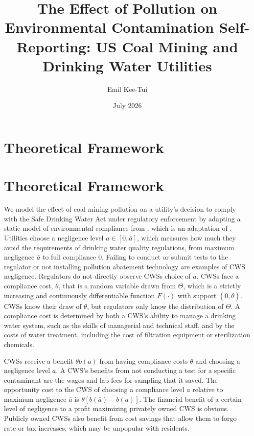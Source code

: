 \documentclass{article}
\begin{document}
\title{The Effect of Pollution on Environmental Contamination Self-Reporting: US Coal Mining and Drinking Water Utilities}
\author{Emil Kee-Tui}
    
\date{July 2026}
\maketitle
\thispagestyle{empty}
\doublespacing
	
\newpage
\doublespacing



\section{Theoretical Framework}

\section{Theoretical Framework}

We model the effect of coal mining pollution on a utility's decision to comply with the Safe Drinking Water Act under regulatory enforcement by adapting a static model of environmental compliance from \cite{kang2021understanding}, which is an adaptation of \cite{mookherjee1994marginal}. Utilities choose a negligence level $a \in [0,\bar{a}]$, which measures how much they avoid the requirements of drinking water quality regulations, from maximum negligence $\bar{a}$ to full compliance 0. Failing to conduct or submit tests to the regulator or not installing pollution abatement technology are examples of CWS negligence. Regulators do not directly observe CWSs choice of $a$. CWSs face a compliance cost, $\theta$, that is a random variable drawn from $\Theta$, which is a strictly increasing and continuously differentiable function $F(\cdot)$ with support $(0,\bar{\theta})$. CWSs know their draw of $\theta$, but regulators only know the distribution of $\Theta$. A compliance cost is determined by both a CWS's ability to manage a drinking water system, such as the skills of managerial and technical staff, and by the costs of water treatment, including the cost of filtration equipment or sterilization chemicals.

CWSs receive a benefit $\theta b(a)$ from having compliance costs $\theta$ and choosing a negligence level $a$. A CWS's benefits from not conducting a test for a specific contaminant are the wages and lab fees for sampling that it saved. The opportunity cost to the CWS of choosing a compliance level $a$ relative to maximum negligence $\bar{a}$ is $\theta [b(\bar{a})-b(a)]$. The financial benefit of a certain level of negligence to a profit maximizing privately owned CWS is obvious. Publicly owned CWSs also benefit from cost savings that allow them to forgo rate or tax increases, which may be unpopular with residents.
\end{document}
